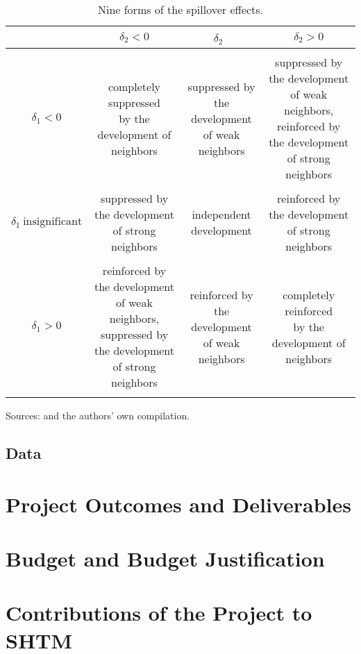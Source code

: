 \documentclass[11pt,a4paper]{amsart}
\theoremstyle{plain}
\theoremstyle{definition}
\begin{document}
\begin{singlespace}
	\begin{table}[H] 
			\caption{Nine forms of the spillover effects.}\label{tb:9cptb}
		\begin{threeparttable}
			\begin{center}
				\begin{NiceTabular*}{\linewidth}{@{\extracolsep{\fill}}cccc}
					\hline
					& $\delta_{2} < 0$ & $\delta_{2}$~  & $\delta_{2} > 0$ \\ 		
					\hline 
					&&&\\
					\parbox{2cm}{$\delta_{1} < 0$} & \parbox{4cm}{completely suppressed \\by the development of neighbors} & \parbox{4cm}{suppressed by the development of weak neighbors} &  \parbox{4cm}{suppressed by the development of weak neighbors, reinforced by the development of strong neighbors} \\
					&&&\\
					\parbox{2cm}{$\delta_{1} ~\text{insignificant}$} & \parbox{4cm}{suppressed by the development of strong neighbors}	 &   \parbox{4cm}{independent \\development}  &  \parbox{4cm}{reinforced by the development of strong neighbors}   \\
					&&&\\
					\parbox{2cm}{$\delta_{1} > 0$}	&  \parbox{4cm}{reinforced by the development of weak neighbors, suppressed by the development of strong neighbors}	&  \parbox{4cm}{reinforced by the development of weak neighbors}	  & \parbox{4cm}{completely reinforced \\ by the development of neighbors}	 \\
					&&&\\
					\hline
				\end{NiceTabular*}
			\end{center}
			\begin{tablenotes}
			\item Sources: \textcite{diaoSpatialSpilloverEffect2021} and the authors’ own compilation.
			\end{tablenotes}
		\end{threeparttable}
	\end{table}
\end{singlespace}
\subsection{Data}
\section{Project Outcomes and Deliverables}
\section{Budget and Budget Justification}
\section{Contributions of the Project to SHTM}

\printbibliography %
		
\end{document}
